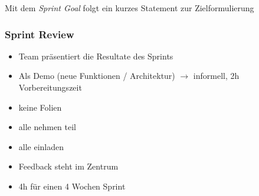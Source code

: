 \documentclass{report}
\theoremstyle{definition}
\theoremstyle{example}
\begin{document}
Mit dem \textit{Sprint Goal} folgt ein kurzes Statement zur Zielformulierung
\subsubsection{Sprint Review}
\begin{itemize}
	\item Team präsentiert die Resultate des Sprints
	\item Als Demo (neue Funktionen / Architektur) $\rightarrow$ informell, 2h Vorbereitungszeit
	\item keine Folien
	\item alle nehmen teil
	\item alle einladen
	\item Feedback steht im Zentrum
	\item 4h für einen 4 Wochen Sprint
\end{itemize}
\end{document}
